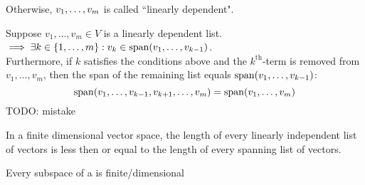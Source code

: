 \begin{mydef} 
  Otherwise, $v_1, \dots, v_m$ is called ``linearly dependent".
\end{mydef}




\setcounter{thm}{18}
\begin{thm} 
  \label{linear-dependence-lemma}
  Suppose $v_{1}, \dots, v_{m}\in V$ is a linearly dependent list.
  $\implies \exists k \in \{ 1, \dots, m \} : v_k \in \operatorname{span} (v_1, \dots, v_{k-1})$. \\
  Furthermore, if $k$ satisfies the conditions above and the $k^{\text{th}}$-term is removed from $v_1, \dots, v_m$, then the span of the remaining list equals $\operatorname{span} (v_1, \dots, v_{k-1})$:
  \begin{equation}
    \operatorname{span} (v_1, \dots, v_{k-1}, v_{k+1}, \dots, v_m) = \operatorname{span} (v_1, \dots, v_m)
  \end{equation}
  TODO: mistake
\end{thm}

\setcounter{thm}{21}

\begin{thm}  
  \label{length-of-linearly-dependent-list-less-or-equal-length-of-spanning-list}
  In a finite dimensional vector space, the length of every linearly independent list of vectors is less then or equal to the length of every spanning list of vectors.
\end{thm}

\setcounter{thm}{24}
\begin{thm} 
  Every subspace of a \findimvs is finite\-/dimensional
\end{thm}
